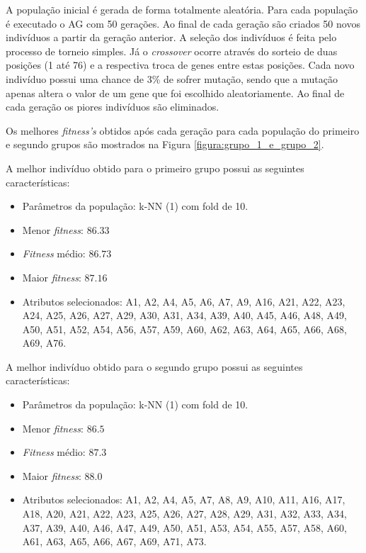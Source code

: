 \documentclass[conference]{IEEEtran}
\begin{document}
A população inicial é gerada de forma totalmente aleatória. Para cada população é executado o AG com 50 gerações. Ao final de cada geração são criados 50 novos indivíduos a partir da geração anterior. A seleção dos indivíduos é feita pelo processo de torneio simples. Já o \textit{crossover} ocorre através do sorteio de duas posições (1 até 76) e a respectiva troca de genes entre estas posições. Cada novo indivíduo possui uma chance de 3\% de sofrer mutação, sendo que a mutação apenas altera o valor de um gene que foi escolhido aleatoriamente. Ao final de cada geração os piores indivíduos são eliminados.

Os melhores \textit{fitness's} obtidos após cada geração para cada população do primeiro e segundo grupos são mostrados na Figura \ref{figura:grupo_1_e_grupo_2}.

A melhor indivíduo obtido para o primeiro grupo possui as seguintes características:

\begin{itemize}
  \item Parâmetros da população: k-NN (1) com fold de 10.
  \item Menor \textit{fitness}: $86.33$
  \item \textit{Fitness} médio: $86.73$
  \item Maior \textit{fitness}: $87.16$  
  \item Atributos selecionados: A1, A2, A4, A5, A6, A7, A9, A16, A21, A22, A23, A24, A25, A26, A27, A29, A30, A31, A34, A39, A40, A45, A46, A48, A49, A50, A51, A52, A54, A56, A57, A59, A60, A62, A63, A64, A65, A66, A68, A69, A76.
\end{itemize}

A melhor indivíduo obtido para o segundo grupo possui as seguintes características:

\begin{itemize}
  \item Parâmetros da população: k-NN (1) com fold de 10.
  \item Menor \textit{fitness}: $86.5$
  \item \textit{Fitness} médio: $87.3$
  \item Maior \textit{fitness}: $88.0$  
  \item Atributos selecionados: A1, A2, A4, A5, A7, A8, A9, A10, A11, A16, A17, A18, A20, A21, A22, A23, A25, A26, A27, A28, A29, A31, A32, A33, A34, A37, A39, A40, A46, A47, A49, A50, A51, A53, A54, A55, A57, A58, A60, A61, A63, A65, A66, A67, A69, A71, A73.
\end{itemize}
\end{document}
